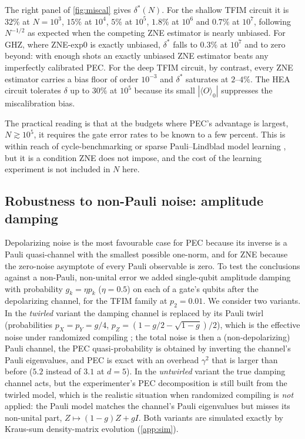 \documentclass[11pt,a4paper]{article}
\theoremstyle{remark}
\begin{document}
The right panel of \cref{fig:miscal} gives $\delta^*(N)$. For the shallow TFIM circuit it is $32\%$ at $N=10^3$, $15\%$ at $10^4$, $5\%$ at $10^5$, $1.8\%$ at $10^6$ and $0.7\%$ at $10^7$, following $N^{-1/2}$ as expected when the competing ZNE estimator is nearly unbiased. For GHZ, where ZNE-exp0 is exactly unbiased, $\delta^*$ falls to $0.3\%$ at $10^7$ and to zero beyond: with enough shots an exactly unbiased ZNE estimator beats any imperfectly calibrated PEC. For the deep TFIM circuit, by contrast, every ZNE estimator carries a bias floor of order $10^{-3}$ and $\delta^*$ saturates at $2$--$4\%$. The HEA circuit tolerates $\delta$ up to $30\%$ at $10^5$ because its small $|\langle O\rangle_0|$ suppresses the miscalibration bias.

The practical reading is that at the budgets where PEC's advantage is largest, $N\gtrsim10^5$, it requires the gate error rates to be known to a few percent. This is within reach of cycle-benchmarking or sparse Pauli--Lindblad model learning \cite{vandenberg2023}, but it is a condition ZNE does not impose, and the cost of the learning experiment is not included in $N$ here.


\subsection{Robustness to non-Pauli noise: amplitude damping}
\label{sec:ampdamp}

Depolarizing noise is the most favourable case for PEC because its inverse is a Pauli quasi-channel with the smallest possible one-norm, and for ZNE because the zero-noise asymptote of every Pauli observable is zero. To test the conclusions against a non-Pauli, non-unital error we added single-qubit amplitude damping with probability $g_k=\eta p_k$ ($\eta=0.5$) on each of a gate's qubits after the depolarizing channel, for the TFIM family at $p_2=0.01$. We consider two variants. In the \emph{twirled} variant the damping channel is replaced by its Pauli twirl (probabilities $p_X=p_Y=g/4$, $p_Z=(1-g/2-\sqrt{1-g})/2$), which is the effective noise under randomized compiling \cite{wallman2016}; the total noise is then a (non-depolarizing) Pauli channel, the PEC quasi-probability is obtained by inverting the channel's Pauli eigenvalues, and PEC is exact with an overhead $\gamma^2$ that is larger than before ($5.2$ instead of $3.1$ at $d=5$). In the \emph{untwirled} variant the true damping channel acts, but the experimenter's PEC decomposition is still built from the twirled model, which is the realistic situation when randomized compiling is \emph{not} applied: the Pauli model matches the channel's Pauli eigenvalues but misses its non-unital part, $Z\mapsto(1-g)Z+gI$. Both variants are simulated exactly by Kraus-sum density-matrix evolution (\cref{app:sim}).
\end{document}
